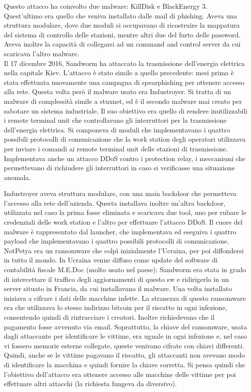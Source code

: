 Questo attacco ha coinvolto due malware: KillDisk e BlackEnergy 3. Quest'ultimo era quello che  veniva installato dalle mail di phishing. Aveva una struttura modulare, dove due moduli si occupavano di ricostruire la mappatura del sistema di controllo delle stazioni, mentre altri due del furto delle password. Aveva inoltre la capacità di collegarsi ad un command and control server da cui scaricava l'altro malware. 
 \\
 
\noindent  Il 17 dicembre 2016, Sandworm ha attaccato la trasmissione dell'energia elettrica nella capitale Kiev. L'attacco è stato simile a quello precedente: mesi prima è stata effettuata nuovamente una campagna di spearphishing per ottenere accesso alla rete. Questa volta però il malware usato era Industroyer. Si tratta di un malware di complessità simile a stuxnet, ed è il secondo malware mai creato per sabotare un sistema industriale. Il suo obiettivo era quello di rendere inutilizzabili i remote terminal unit che controllavano gli interruttori per la trasmissione dell'energia elettrica. Si componeva di moduli che implementavano i quattro possibili protocolli di comunicazione che la work station degli operatori utilizzava per inviare i comandi ai remote terminal unit delle stazioni di trasmissione. Implementava anche un attacco DDoS contro i protection relay, i meccanismi che permettevano di richiudere gli interruttori in caso si verificasse una situazione anomala. 

 Industroyer aveva struttura modulare, con una main backdoor che permetteva l'accesso alla rete dell'azienda. Questa installava inoltre un'altra backdoor, utilizzata nel caso la prima fosse eliminata e scaricava due tool, uno per rubare le credenziali delle work station e l'altro per effettuare l'attacco DDoS. Il cuore del malware è rappresentato dal launcher, che implementava ed eseguiva i quattro payload che implementavano i quattro possibili protocolli di comunicazione. 
\\

\noindent NotPetya era un ransomware che colpì inizialmente l'Ucraina, per poi diffondersi in tutto il mondo. 
In Ucraina venne diffuso come update del software di contabilità fiscale M.E.Doc (molto usato nel paese): Sandworm era stata in grado di intercettare il traffico degli aggiornamenti di questo sw e ridirigerlo in un server situato in Francia, da cui installavano il malware. Una volta installato iniziava a cifrare i dati delle macchine infette. La stranezza di questo ransomware era che utilizzava lo stesso indirizzo bitcoin per il riscatto in ogni infezione, consentendo quindi di rintracciare i creatori. Inoltre richiedevano che  il pagamento fosse avvenuto via email. Soprattutto, la chiave del ransomware, usata dagli attaccante per identificare le vittime, era uguale in ogni infezione e, nel caso vi fossero memorie esterne collegate, queste venivano cifrate con chiavi differenti. Quindi, anche se le vittime pagavano il riscatto, gli attaccanti non avevano modo di identificare la macchina e quindi fornire la chiave corretta. Si pensa quindi che l'obiettivo dell'attacco era ottenere accesso alle macchine delle vittime per poi effettuare altri attacchi (la richiesta fungeva da diversivo).


	
	
	
	

